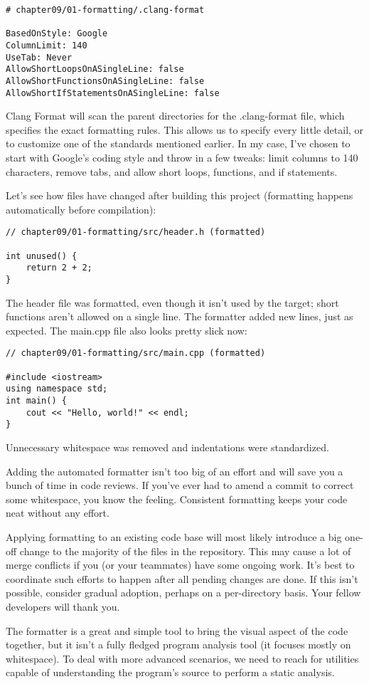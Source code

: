 \begin{lstlisting}[style=stylePython]
# chapter09/01-formatting/.clang-format

BasedOnStyle: Google
ColumnLimit: 140
UseTab: Never
AllowShortLoopsOnASingleLine: false
AllowShortFunctionsOnASingleLine: false
AllowShortIfStatementsOnASingleLine: false
\end{lstlisting}

Clang Format will scan the parent directories for the .clang-format file, which specifies the exact formatting rules. This allows us to specify every little detail, or to customize one of the standards mentioned earlier. In my case, I've chosen to start with Google's coding style and throw in a few tweaks: limit columns to 140 characters, remove tabs, and allow short loops, functions, and if statements.

Let's see how files have changed after building this project (formatting happens automatically before compilation):

\begin{lstlisting}[style=styleCXX]
// chapter09/01-formatting/src/header.h (formatted)

int unused() {
	return 2 + 2;
}
\end{lstlisting}

The header file was formatted, even though it isn't used by the target; short functions aren't allowed on a single line. The formatter added new lines, just as expected. The main.cpp file also looks pretty slick now:

\begin{lstlisting}[style=styleCXX]
// chapter09/01-formatting/src/main.cpp (formatted)

#include <iostream>
using namespace std;
int main() {
	cout << "Hello, world!" << endl;
}
\end{lstlisting}

Unnecessary whitespace was removed and indentations were standardized.

Adding the automated formatter isn't too big of an effort and will save you a bunch of time in code reviews. If you've ever had to amend a commit to correct some whitespace, you know the feeling. Consistent formatting keeps your code neat without any effort.

\begin{tcolorbox}[colback=blue!5!white,colframe=blue!75!black,title=Note]
Applying formatting to an existing code base will most likely introduce a big one-off change to the majority of the files in the repository. This may cause a lot of merge conflicts if you (or your teammates) have some ongoing work. It's best to coordinate such efforts to happen after all pending changes are done. If this isn't possible, consider gradual adoption, perhaps on a per-directory basis. Your fellow developers will thank you.
\end{tcolorbox}

The formatter is a great and simple tool to bring the visual aspect of the code together, but it isn't a fully fledged program analysis tool (it focuses mostly on whitespace). To deal with more advanced scenarios, we need to reach for utilities capable of understanding the program's source to perform a static analysis.